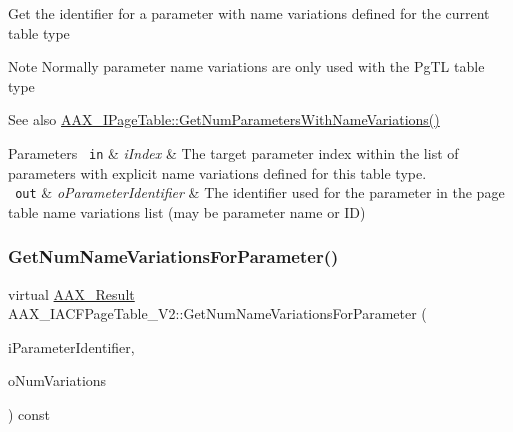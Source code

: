 Get the identifier for a parameter with name variations defined for the current table type

\begin{DoxyNote}{Note}
Normally parameter name variations are only used with the {\ttfamily \textquotesingle{}Pg\+TL\textquotesingle{}} table type
\end{DoxyNote}

\begin{DoxyItemize}
\item \begin{DoxySeeAlso}{See also}
\mbox{\hyperlink{a01849_ad186d2870ad5c188a7375080e8a7907b}{A\+A\+X\+\_\+\+I\+Page\+Table\+::\+Get\+Num\+Parameters\+With\+Name\+Variations()}}
\end{DoxySeeAlso}

\begin{DoxyParams}[1]{Parameters}
\mbox{\texttt{ in}}  & {\em i\+Index} & The target parameter index within the list of parameters with explicit name variations defined for this table type. \\
\hline
\mbox{\texttt{ out}}  & {\em o\+Parameter\+Identifier} & The identifier used for the parameter in the page table name variations list (may be parameter name or ID) \\
\hline
\end{DoxyParams}

\end{DoxyItemize}\mbox{\label{a01729_af0c22a440afacf5e9ebeaccab11ecde3}} 
\subsubsection{\texorpdfstring{GetNumNameVariationsForParameter()}{GetNumNameVariationsForParameter()}}
{\footnotesize\ttfamily virtual \mbox{\hyperlink{a00392_a4d8f69a697df7f70c3a8e9b8ee130d2f}{A\+A\+X\+\_\+\+Result}} A\+A\+X\+\_\+\+I\+A\+C\+F\+Page\+Table\+\_\+\+V2\+::\+Get\+Num\+Name\+Variations\+For\+Parameter (\begin{DoxyParamCaption}\item[{\mbox{\hyperlink{a00392_ab4e01b971dac1b25632fd9f710dd8f77}{A\+A\+X\+\_\+\+C\+Page\+Table\+Param\+ID}}}]{i\+Parameter\+Identifier,  }\item[{int32\+\_\+t \&}]{o\+Num\+Variations }\end{DoxyParamCaption}) const\hspace{0.3cm}{\ttfamily [pure virtual]}}





